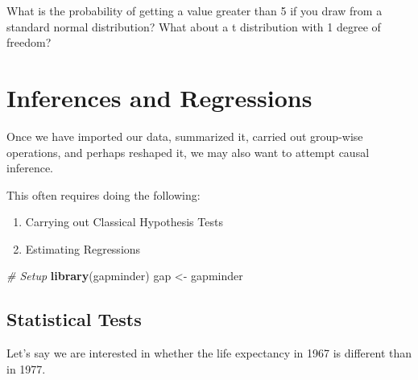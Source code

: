 \documentclass[
]{book}
\newenvironment{Shaded}{\begin{snugshade}}{\end{snugshade}}
\newcommand{\CommentTok}[1]{\textcolor[rgb]{0.56,0.35,0.01}{\textit{#1}}}
\newcommand{\DecValTok}[1]{\textcolor[rgb]{0.00,0.00,0.81}{#1}}
\newcommand{\FloatTok}[1]{\textcolor[rgb]{0.00,0.00,0.81}{#1}}
\newcommand{\KeywordTok}[1]{\textcolor[rgb]{0.13,0.29,0.53}{\textbf{#1}}}
\newcommand{\NormalTok}[1]{#1}
\newcommand{\OperatorTok}[1]{\textcolor[rgb]{0.81,0.36,0.00}{\textbf{#1}}}
\newcommand{\StringTok}[1]{\textcolor[rgb]{0.31,0.60,0.02}{#1}}
\providecommand{\tightlist}{%
  \setlength{\itemsep}{0pt}\setlength{\parskip}{0pt}}
\begin{document}
What is the probability of getting a value greater than 5 if you draw from a standard normal distribution? What about a t distribution with 1 degree of freedom?

\hypertarget{inferences-and-regressions}{%
\section{Inferences and Regressions}\label{inferences-and-regressions}}

Once we have imported our data, summarized it, carried out group-wise operations, and perhaps reshaped it, we may also want to attempt causal inference.

This often requires doing the following:

\begin{enumerate}
\def\labelenumi{\arabic{enumi})}
\tightlist
\item
  Carrying out Classical Hypothesis Tests
\item
  Estimating Regressions
\end{enumerate}

\begin{Shaded}
\begin{Highlighting}[]
\CommentTok{# Setup}
\KeywordTok{library}\NormalTok{(gapminder)}
\NormalTok{gap <-}\StringTok{ }\NormalTok{gapminder}
\end{Highlighting}
\end{Shaded}

\hypertarget{statistical-tests}{%
\subsection{Statistical Tests}\label{statistical-tests}}

Let's say we are interested in whether the life expectancy in 1967 is different than in 1977.

\begin{Shaded}
\end{Shaded}
\end{document}
